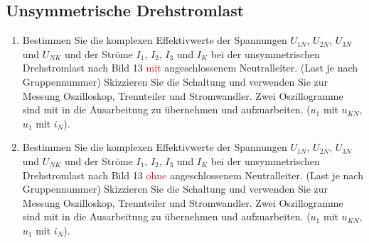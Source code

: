 \begin{enumerate}[label=\alph*)]
 		\end{enumerate}
 	\subsection{Unsymmetrische Drehstromlast}
	 	\begin{enumerate}[label=\alph*)]
	 		\item Bestimmen Sie die komplexen Effektivwerte der Spannungen $U_{1N}$, $U_{2N}$, $U_{3N}$ und $U_{NK}$ und der Ströme $I_{1}$, $I_{2}$, $I_{3}$ und $I_{K}$ bei der unsymmetrischen Drehstromlast nach Bild 13 \textcolor{red}{mit} angeschlossenem Neutralleiter. (Last je nach Gruppennummer)
	 		\newline
			Skizzieren Sie die Schaltung und verwenden Sie zur Messung Oszilloskop, Trennteiler und Stromwandler. Zwei Oszillogramme sind mit in die Ausarbeitung zu übernehmen und aufzuarbeiten. ($u_{1}$ mit $u_{KN}$, $u_{1}$ mit $i_{N}$).
			
			\item Bestimmen Sie die komplexen Effektivwerte der Spannungen $U_{1N}$, $U_{2N}$, $U_{3N}$ und $U_{NK}$ und der Ströme $I_{1}$, $I_{2}$, $I_{3}$ und $I_{K}$ bei der unsymmetrischen  Drehstromlast nach Bild 13 \textcolor{red}{ohne} angeschlossenem Neutralleiter. (Last je nach Gruppennummer)
			\newline
			Skizzieren Sie die Schaltung und verwenden Sie zur Messung Oszilloskop, Trennteiler und Stromwandler. Zwei Oszillogramme sind mit in die Ausarbeitung zu übernehmen und aufzuarbeiten. ($u_{1}$ mit $u_{KN}$, $u_{1}$ mit $i_{N}$). 
			
			
	 	\end{enumerate}